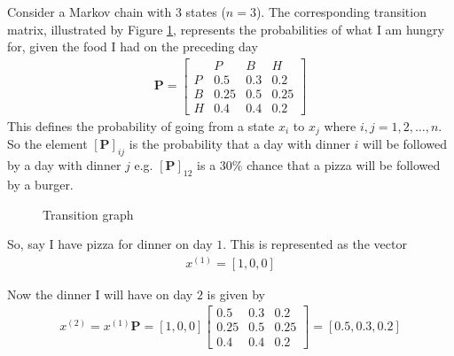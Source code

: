 \documentclass[12pt,twoside]{report}   %
\begin{document}
Consider a Markov chain with $3$ states ($n=3$). The corresponding transition matrix, illustrated by Figure \ref{figMarkovProcess}, represents the probabilities of what I am hungry for, given the food I had on the preceding day
\begin{align*}
\textbf{P} = \begin{bmatrix}
	& P & B & H \\
    P & 0.5 & 0.3 & 0.2 \\
    B & 0.25 & 0.5 & 0.25 \\
    H & 0.4 & 0.4 & 0.2
\end{bmatrix}
\end{align*}
This defines the probability of going from a state $x_i$ to $x_j$ where $i,j = 1,2,\ldots,n$. So the element $[\textbf{P}]_{ij}$ is the probability that a day with dinner $i$ will be followed by a day with dinner $j$ e.g. $[\textbf{P}]_{12}$ is a $30\%$ chance that a pizza will be followed by a burger.

\begin{figure}[H]
\centering
{}
\caption{Transition graph }
\label{figMarkovProcess}
\end{figure}

So, say I have pizza for dinner on day $1$. This is represented as the vector
\begin{align*}
{x}^{(1)} = [1,0,0]
\end{align*}

Now the dinner I will have on day $2$ is given by
\begin{align*}
{x}^{(2)} = {x}^{(1)}\textbf{P} = [1,0,0]\begin{bmatrix}
    0.5 & 0.3 & 0.2 \\
    0.25 & 0.5 & 0.25 \\
    0.4 & 0.4 & 0.2
\end{bmatrix} = [0.5,0.3,0.2]
\end{align*}
\end{document}
